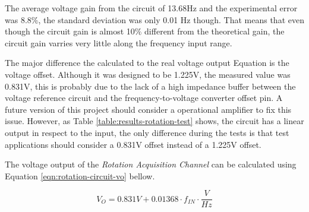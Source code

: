 		The average voltage gain from the circuit of 13.68Hz and the experimental error was 8.8$\%$, the standard deviation was only 0.01 Hz though. That means that even though the circuit gain is almost 10$\%$ different from the theoretical gain, the circuit gain varries very little along the frequency input range.
		\par
		The major difference the calculated to the real voltage output Equation is the voltage offset. Although it was designed to be 1.225V, the measured value was 0.831V, this is probably due to the lack of a high impedance buffer between the voltage reference circuit and the frequency-to-voltage converter offset pin. A future version of this project should consider a operational amplifier to fix this issue. However, as Table \ref{table:results-rotation-test} shows, the circuit has a linear output in respect to the input, the only difference during the tests is that test applications should consider a 0.831V offset instead of a 1.225V offset.
		\par
		The voltage output of the \textit{Rotation Acquisition Channel} can be calculated using Equation \ref{eqn:rotation-circuit-vo} bellow.
			
			\begin{equation}\label{eqn:rotation-circuit-vo}
				V_{O}=0.831V + 0.01368 \cdot f_{IN}  \cdot \frac{V}{Hz}
			\end{equation}